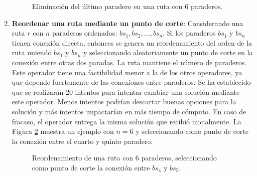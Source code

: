 \begin{enumerate}
\begin{figure}[!htb]
\begin{center}
\end{center}
\caption{Eliminación del último paradero en una ruta con 6 paraderos.}
\label{fig:mut2}
\end{figure}

\item \textbf{Reordenar una ruta mediante un punto de corte}: Considerando una ruta $r$ con $n$ paraderos ordenados: $bs_1, bs_2, \ldots, bs_n$. Si los paraderos $bs_1$ y $bs_n$ tienen conexión directa, entonces se genera un reordenamiento del orden de la ruta uniendo $bs_1$ y $bs_n$ y seleccionando aleatoriamente un punto de corte en la conexión entre otras dos paradas. La ruta mantiene el número de paraderos. Este operador tiene una factibilidad menor a la de los otros operadores, ya que depende fuertemente de las conexiones entre paraderos. Se ha establecido que se realizarán 20 intentos para intentar cambiar una solución mediante este operador. Menos intentos podrían descartar buenas opciones para la solución y más intentos impactarían en más tiempo de cómputo. En caso de fracaso, el operador entrega la misma solución que recibió inicialmente. La Figura \ref{fig:mut3} muestra un ejemplo con $n=6$ y seleccionando como punto de corte la conexión entre el cuarto y quinto paradero.

\begin{figure}[!htb]
\begin{center}
\end{center}
\caption{Reordenamiento de una ruta con 6 paraderos, seleccionando como punto de corte la conexión entre $bs_4$ y $bs_5$.}
\label{fig:mut3}
\end{figure}
\end{enumerate}

